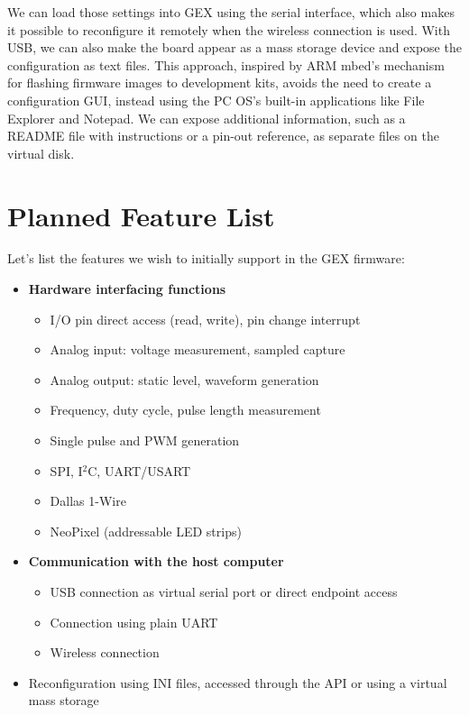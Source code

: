 We can load those settings into GEX using the serial interface, which also makes it possible to reconfigure it remotely when the wireless connection is used. With USB, we can also make the board appear as a mass storage device and expose the configuration as text files. This approach, inspired by ARM mbed's mechanism for flashing firmware images to development kits, avoids the need to create a configuration GUI, instead using the PC OS's built-in applications like File Explorer and Notepad. We can expose additional information, such as a README file with instructions or a pin-out reference, as separate files on the virtual disk.

\section{Planned Feature List}

Let's list the features we wish to initially support in the GEX firmware:

\begin{itemize}
	\item \textbf{Hardware interfacing functions}
		\begin{itemize}	
			\item I/O pin direct access (read, write), pin change interrupt
			\item Analog input: voltage measurement, sampled capture
			\item Analog output: static level, waveform generation
			\item Frequency, duty cycle, pulse length measurement
			\item Single pulse and PWM generation
			\item SPI, I$^2$C, UART/USART
			\item Dallas 1-Wire
			\item NeoPixel (addressable LED strips)	
		\end{itemize}
	\item \textbf{Communication with the host computer}
		\begin{itemize}	
			\item USB connection as virtual serial port or direct endpoint access
			\item Connection using plain UART
			\item Wireless connection
		\end{itemize}
	\item Reconfiguration using INI files, accessed through the API or using a virtual mass storage
\end{itemize}

